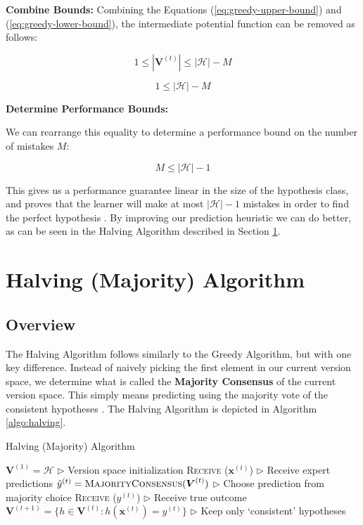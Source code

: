 \documentclass[11pt]{article}
\begin{document}
\textbf{Combine Bounds:
}
Combining the Equations (\ref{eq:greedy-upper-bound}) and (\ref{eq:greedy-lower-bound}), the intermediate potential function can be removed as follows:

$$1 \leq |\boldsymbol{V}^{(t)}| \leq |\mathcal{H}| - M$$

$$1 \leq |\mathcal{H}| - M$$

\textbf{Determine Performance Bounds:
}

We can rearrange this equality to determine a performance bound on the number of mistakes $M$:

$$M \leq |\mathcal{H}| - 1$$


This gives us a performance guarantee linear in the size of the hypothesis class, and proves that the learner will make at most $ |\mathcal{H}| - 1$ mistakes in order to find the perfect hypothesis \cite{shalev-shwartz}. By improving our prediction heuristic we can do better, as can be seen in the Halving Algorithm described in Section \ref{section:halving}.

\section{Halving (Majority) Algorithm}\label{section:halving}

\subsection{Overview}

The Halving Algorithm follows similarly to the Greedy Algorithm, but with one key difference. Instead of naively picking the first element in our current version space, we determine what is called the \textbf{Majority Consensus} of the current version space. This simply means predicting using the majority vote of the consistent hypotheses \cite{shalev-shwartz}. The Halving Algorithm is depicted in Algorithm \ref{algo:halving}.

\begin{algorithm}[H]
\caption{Halving (Majority) Algorithm}
\label{algo:halving}
\begin{algorithmic}[1]
\STATE $\boldsymbol{V}^{(1)} = \mathcal{H}$  \hfill $\triangleright$ Version space initialization
\STATE \textsc{Receive} ($\boldsymbol{x}^{(t)}$) \hfill $\triangleright$ Receive expert predictions
\STATE $\hat{y}^{(t)} = \textsc{MajorityConsensus} (\boldsymbol{V}^{(t)})$ \hfill $\triangleright$ Choose prediction from majority choice
\STATE \textsc{Receive} ($y^{(t)}$) \hfill $\triangleright$ Receive true outcome
\STATE $\boldsymbol{V}^{(t+1)} = \big\{ h \in \boldsymbol{V}^{(t)} : h(\boldsymbol{x}^{(t)}) = y^{(t)} \big\} $ \hfill $\triangleright$ Keep only `consistent' hypotheses
\ENDFOR
\end{algorithmic}
\end{algorithm}
\end{document}

